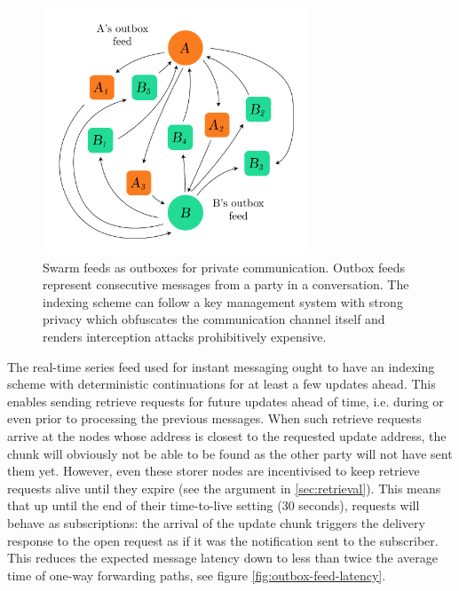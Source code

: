\begin{figure}[htbp]
  \centering
  \includegraphics[width=0.7\textwidth]{fig/feeds-as-channel.pdf}  
  \caption[Swarm feeds as outboxes \statusgreen]{Swarm feeds as outboxes for private communication. Outbox feeds represent consecutive messages from a party in a conversation. The indexing scheme can follow a key management system with strong privacy which obfuscates the communication channel itself and renders interception attacks prohibitively expensive.}
\label{fig:feeds-as-channel}
\end{figure}


The real-time series feed used for instant messaging ought to have an indexing scheme with deterministic continuations for at least a few updates ahead. This enables sending retrieve requests for future updates ahead of time, i.e. during or even prior to processing the previous messages. When such retrieve requests arrive at the nodes whose address is closest to the requested update address, the chunk will obviously not be able to be found as the other party will not have sent them yet. However, even these storer nodes are incentivised to keep retrieve requests alive until they expire (see the argument in \ref{sec:retrieval}). This means that up until the end of their time-to-live setting (30 seconds), requests will behave as subscriptions: the arrival of the update chunk triggers the delivery response to the open request as if it was the notification sent to the subscriber. This reduces the expected message latency down to less than twice the average time of one-way forwarding paths, see figure \ref{fig:outbox-feed-latency}. 


